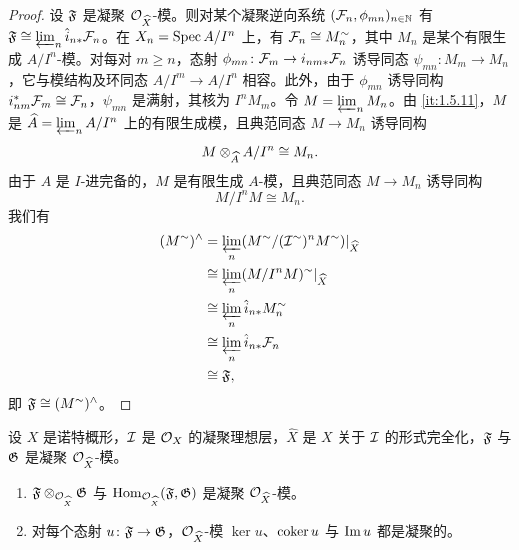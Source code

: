 \begin{proof}
设 $\mathfrak{F}$ 是凝聚 $\mathcal{O}_{\widehat X}$-模。则对某个凝聚逆向系统 $(\mathcal{F}_n,\phi_{mn})_{n\in\mathbb{N}}$ 有 $\mathfrak{F}\cong\varprojlim_n\hat i_{n*}\mathcal{F}_n$。在 $X_n=\operatorname{Spec} A/I^n$ 上，有 $\mathcal{F}_n\cong M_n^{\sim}$，其中 $M_n$ 是某个有限生成 $A/I^n$-模。对每对 $m\ge n$，态射 $\phi_{mn}\colon\mathcal{F}_m\to i_{nm*}\mathcal{F}_n$ 诱导同态 $\psi_{mn}\colon M_m\to M_n$，它与模结构及环同态 $A/I^m\to A/I^n$ 相容。此外，由于 $\phi_{mn}$ 诱导同构 $i_{nm}^*\mathcal{F}_m\cong\mathcal{F}_n$，$\psi_{mn}$ 是满射，其核为 $I^nM_m$。令 $M=\varprojlim_n M_n$。由 \ref{it:1.5.11}，$M$ 是 $\widehat A=\varprojlim_n A/I^n$ 上的有限生成模，且典范同态 $M\to M_n$ 诱导同构
\[
M\otimes_{\widehat A}A/I^n\cong M_n.
\]
由于 $A$ 是 $I$-进完备的，$M$ 是有限生成 $A$-模，且典范同态 $M\to M_n$ 诱导同构
\[
M/I^nM\cong M_n.
\]
我们有
\begin{align*}
(M^{\sim})^{\wedge}
&=\varprojlim_n(M^{\sim}/(\mathcal{I}^{\sim})^nM^{\sim})|_{\widehat X}\\
&\cong\varprojlim_n(M/I^nM)^{\sim}|_{\widehat X}\\
&\cong\varprojlim_n\hat i_{n*}M_n^{\sim}\\
&\cong\varprojlim_n\hat i_{n*}\mathcal{F}_n\\
&\cong\mathfrak{F},
\end{align*}
即 $\mathfrak{F}\cong(M^{\sim})^{\wedge}$。
\end{proof}

\begin{proposition}\label{it:1.5.21}
设 $X$ 是诺特概形，$\mathcal{I}$ 是 $\mathcal{O}_X$ 的凝聚理想层，$\widehat X$ 是 $X$ 关于 $\mathcal{I}$ 的形式完全化，$\mathfrak{F}$ 与 $\mathfrak{G}$ 是凝聚 $\mathcal{O}_{\widehat X}$-模。
\begin{enumerate}[label=(\roman*),leftmargin=2.8em]
  \item $\mathfrak{F}\otimes_{\mathcal{O}_{\widehat X}}\mathfrak{G}$ 与 $\operatorname{Hom}_{\mathcal{O}_{\widehat X}}(\mathfrak{F},\mathfrak{G})$ 是凝聚 $\mathcal{O}_{\widehat X}$-模。
  \item 对每个态射 $u\colon\mathfrak{F}\to\mathfrak{G}$，$\mathcal{O}_{\widehat X}$-模 $\ker u$、$\operatorname{coker} u$ 与 $\operatorname{Im} u$ 都是凝聚的。
\end{enumerate}
\end{proposition}

